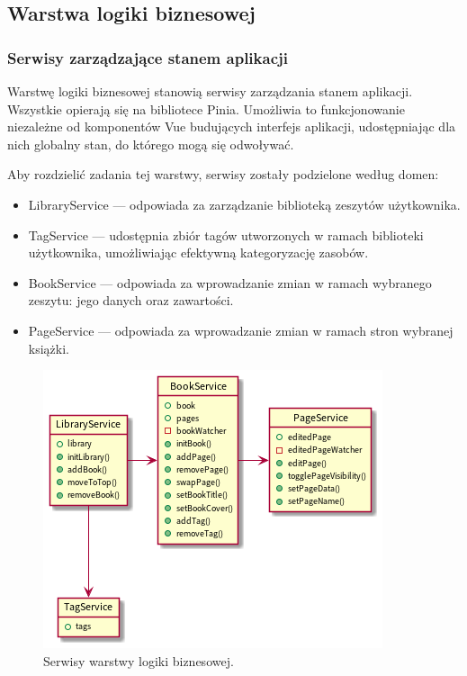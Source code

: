 \subsection{Warstwa logiki biznesowej}
\subsubsection{Serwisy zarządzające stanem aplikacji}
Warstwę logiki biznesowej stanowią serwisy zarządzania stanem aplikacji.
Wszystkie opierają się na bibliotece Pinia.
Umożliwia to funkcjonowanie niezależne od komponentów Vue budujących interfejs aplikacji,
udostępniając dla nich globalny stan, do którego mogą się odwoływać.

Aby rozdzielić zadania tej warstwy, serwisy zostały podzielone według domen:
\begin{itemize}
	\item LibraryService — odpowiada za zarządzanie biblioteką zeszytów użytkownika.
	\item TagService — udostępnia zbiór tagów utworzonych w ramach biblioteki użytkownika, umożliwiając efektywną kategoryzację zasobów.
	\item BookService — odpowiada za wprowadzanie zmian w ramach wybranego zeszytu: jego danych oraz zawartości.
	\item PageService — odpowiada za wprowadzanie zmian w ramach stron wybranej książki.
\end{itemize}

\begin{figure}[H]
	\begin{center}
		\includegraphics[scale=0.9]{media/LogicLayer.png}
	\end{center}
	\caption{Serwisy warstwy logiki biznesowej.}
	\label{rys:logic-layer}
\end{figure}

